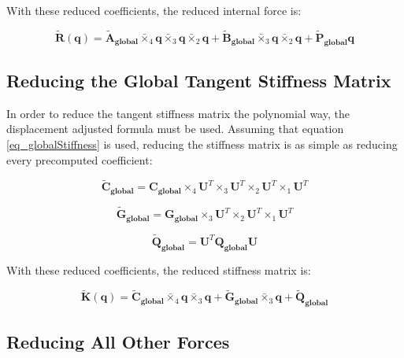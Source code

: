 \documentclass[twocolumn,10pt]{asme2ej}
\begin{document}
With these reduced coefficients, the reduced internal force is:

\begin{equation}
  \bm{\tilde{R}}(\bm{q}) = \bm{\tilde{A}_{global}} \bar{\times}_4 \bm{q} \bar{\times}_3 \bm{q} \bar{\times}_2 \bm{q}
  + \bm{\tilde{B}_{global}} \bar{\times}_3 \bm{q} \bar{\times}_2 \bm{q} + \bm{\tilde{P}_{global}}\bm{q}
  \label{eq_reducedForce}
\end{equation}

\subsection{Reducing the Global Tangent Stiffness Matrix}

In order to reduce the tangent stiffness matrix the polynomial way, the displacement adjusted formula must be used. Assuming that equation \ref{eq_globalStiffness} is used, reducing the stiffness matrix is as simple as reducing every precomputed coefficient:

\begin{equation}
  \bm{\tilde{C}_{global}} = \bm{C_{global}} \times_4 \bm{U}^T  \times_3 \bm{U}^T  \times_2 \bm{U}^T  \times_1 \bm{U}^T
\end{equation}

\begin{equation}
  \bm{\tilde{G}_{global}} = \bm{G_{global}} \times_3 \bm{U}^T  \times_2 \bm{U}^T  \times_1 \bm{U}^T
\end{equation}

\begin{equation}
  \bm{\tilde{Q}_{global}} = \bm{U}^T \bm{Q_{global}} \bm{U}
\end{equation}

With these reduced coefficients, the reduced stiffness matrix is:

\begin{equation}
  \bm{\tilde{K}}(\bm{q}) = \bm{\tilde{C}_{global}} \bar{\times}_4 \bm{q} \bar{\times}_3 \bm{q}
  + \bm{\tilde{G}_{global}} \bar{\times}_3 \bm{q} + \bm{\tilde{Q}_{global}}
  \label{eq_reducedStiffness}
\end{equation}

\subsection{Reducing All Other Forces}
\end{document}
